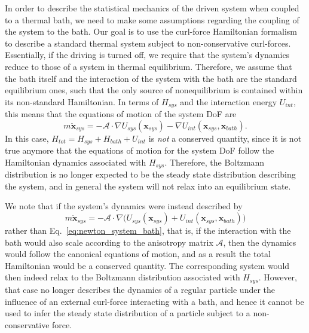 In order to describe the statistical mechanics of the driven system when coupled to a thermal bath, we need to make some assumptions regarding the coupling of the system to the bath. Our goal is to use the curl-force Hamiltonian formalism to describe a standard thermal system subject to non-conservative curl-forces. Essentially, if the driving is turned off, we require that the system's dynamics reduce to those of a system in thermal equilibrium.
Therefore, we assume that the bath itself and the interaction of the system with the bath are the standard equilibrium ones, such that the only source of nonequilibrium is contained within its non-standard Hamiltonian. In terms of $H_{sys}$ and the interaction energy $U_{int}$, this means that the equations of motion of the system DoF are
\begin{equation}\label{eq:newton_system_bath}
      m\ddot{\mathbf{ x}}_{sys} = -\mathcal{A}\cdot\nabla U_{sys}(\mathbf x_{sys}) -\nabla U_{int}(\mathbf x_{sys},\mathbf x_{bath}).
\end{equation}
In this case, $H_{tot} = H_{sys}+H_{bath} +  U_{int}$ is \emph{not} a conserved quantity, since it is not true anymore that the equations of motion for the system DoF follow the Hamiltonian dynamics associated with 
$H_{sys}$. Therefore, the Boltzmann distribution is no longer expected to be the steady state distribution describing the system, and in general the system will not relax into an equilibrium state. 

We note that if the system's dynamics were instead described by
\begin{equation}\label{eq:newton_system_modified}
    m\ddot{\mathbf{ x}}_{sys} = -\mathcal{A}\cdot\nabla\Big(U_{sys}(\mathbf x_{sys}) + U_{int}(\mathbf x_{sys},\mathbf x_{bath})\Big)
\end{equation}
rather than Eq.~\ref{eq:newton_system_bath}, that is, if the interaction with the bath would also scale according to the anisotropy matrix $\mathcal{A}$, then the dynamics would follow the canonical equations of motion, and as a result the total Hamiltonian would be a conserved quantity. The corresponding system would then indeed relax to the Boltzmann distribution associated with $H_{sys}$. However, that case no longer describes the dynamics of a regular particle under the influence of an external curl-force interacting with a bath, and hence it cannot be used to infer the steady state distribution of a particle subject to a non-conservative force. 

